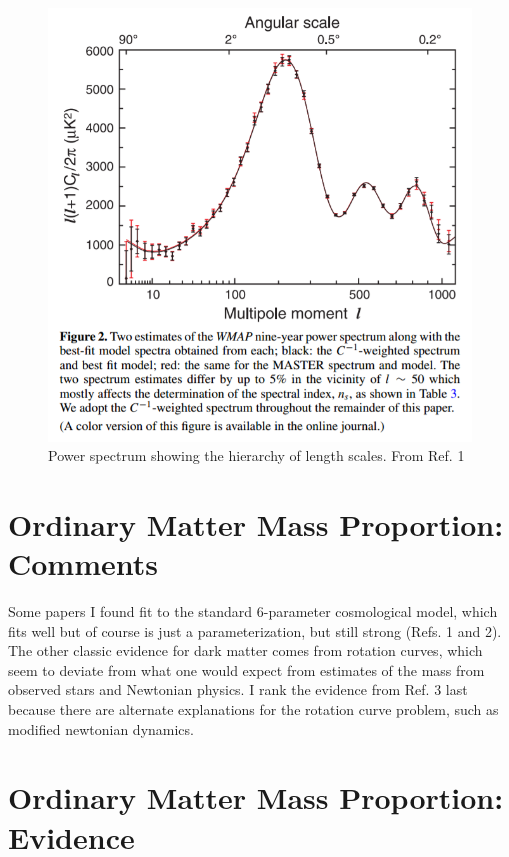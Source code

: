 \documentclass{article}
\begin{document}
\begin{figure}[h]
\begin{center}
\includegraphics[width=\linewidth,angle=0.]{powerSpectrum.png}
\end{center}
\caption{Power spectrum showing the hierarchy of length scales. From Ref. 1}
\end{figure}

\newpage
\section{Ordinary Matter Mass Proportion: Comments}
Some papers I found fit to the standard 6-parameter cosmological model, which fits well but of course is just a parameterization, but still strong (Refs. 1 and 2). The other classic evidence for dark matter comes from rotation curves, which seem to deviate from what one would expect from estimates of the mass from observed stars and Newtonian physics. I rank the evidence from Ref. 3 last because there are alternate explanations for the rotation curve problem, such as modified newtonian dynamics. 

\newpage
\section*{Ordinary Matter Mass Proportion: Evidence}
\end{document}
